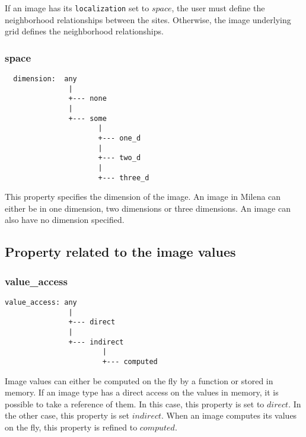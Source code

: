 If an image has its \verb+localization+ set to $space$, the user must define
the neighborhood relationships between the sites.
Otherwise, the image underlying grid defines the neighborhood relationships.



\subsubsection{space}

\begin{verbatim}
  dimension:  any
               |
               +--- none
               |
               +--- some
                      |
                      +--- one_d
                      |
                      +--- two_d
                      |
                      +--- three_d
\end{verbatim}

This property specifies the dimension of the image.
An image in Milena can either be in one dimension, two dimensions or three dimensions.
An image can also have no dimension specified.



\subsection{Property related to the image values}


\subsubsection{value\_access}

\begin{verbatim}
value_access: any
               |
               +--- direct
               |
               +--- indirect
                       |
                       +--- computed
\end{verbatim}


Image values can either be computed on the fly by a function or stored in
memory. If an image type has a direct access on the values in memory, it is
possible to take a reference of them. In this case, this property is set to
$direct$. In the other case, this property is set $indirect$. When an image
computes its values on the fly, this property is refined to $computed$.


